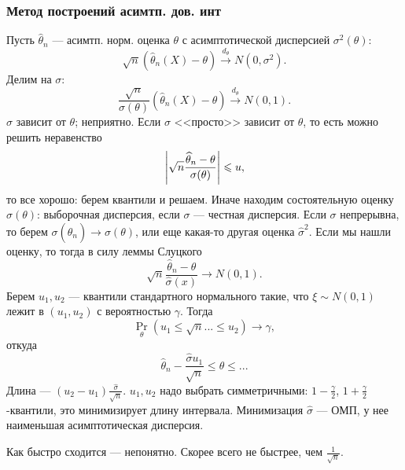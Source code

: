 \subsubsection{Метод построений асимтп. дов. инт}
Пусть \(\widehat{\theta}_n\) --- асимтп. норм. оценка \(\theta\) с асимптотической дисперсией \(\sigma^2(\theta)\):
\begin{displaymath}
    \sqrt{n} \left(\widehat{\theta}_n(X) - \theta\right) \overset{d_\theta}{\to} N(0, \sigma^2).
\end{displaymath}
Делим на \(\sigma:\)
\begin{displaymath}
    \frac{\sqrt{n}}{\sigma(\theta)} \left(\widehat{\theta}_n(X) - \theta\right) \overset{d_\theta}{\to} N(0, 1).
\end{displaymath}
\(\sigma\) зависит от \(\theta\); неприятно. Если \(\sigma\) <<просто>> зависит от \(\theta\), то есть можно решить неравенство
\begin{displaymath}
\left|\sqrt{n} \frac{\widehat{\theta}_n - \theta}{\sigma(\theta)}\right| \leqslant u,
\end{displaymath}
то все хорошо: берем квантили и решаем. Иначе находим состоятельную оценку \(\sigma(\theta)\): выборочная дисперсия, если \(\sigma\) --- честная дисперсия.
Если \(\sigma\) непрерывна, то берем \(\sigma(\widehat{\theta}_n) \to \sigma(\theta)\), или еще какая-то другая оценка \(\widehat{\sigma}^2\).
Если мы нашли оценку, то тогда в силу леммы Слуцкого
\begin{displaymath}
    \sqrt{n} \frac{\widehat{\theta}_n - \theta}{\widehat{\sigma}(x)} \to N(0, 1).
\end{displaymath}
Берем \(u_1, u_2\) --- квантили стандартного нормального такие, что \(\xi \sim N(0, 1)\) лежит в \((u_1, u_2)\) с вероятностью \(\gamma\). Тогда
\begin{displaymath}
    \Pr_\theta \left(u_1 \leq \sqrt{n} ... \leq u_2\right) \to \gamma,
\end{displaymath}
откуда
\begin{displaymath}
    \widehat{\theta}_n - \frac{\widehat{\sigma} u_1 }{\sqrt{n}} \leq \theta \leq ...
\end{displaymath}
Длина --- \((u_2 - u_1) \frac{\widehat{\sigma}}{\sqrt{n}}\).
\(u_1, u_2\) надо выбрать симметричными: \(1 - \frac{\gamma}{2}\), \(1 + \frac{\gamma}{2}\)-квантили, это минимизирует длину интервала.
Минимизация \(\widehat\sigma\) --- ОМП, у нее наименьшая асимптотическая дисперсия.

\begin{remark}
    Как быстро сходится --- непонятно. Скорее всего не быстрее, чем \(\frac1{\sqrt{n}}\).
\end{remark}

